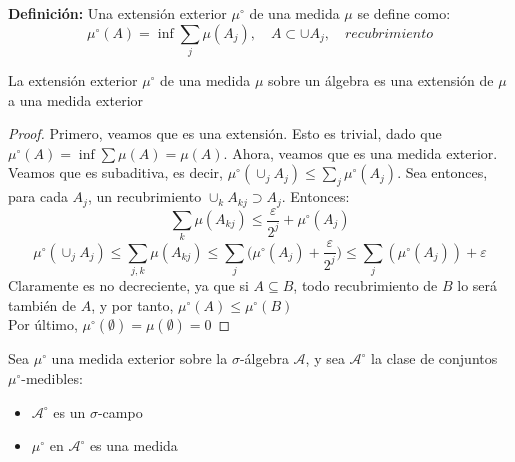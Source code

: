 \textbf{Definición:} Una extensión exterior $\mu^\circ$ de una medida $\mu$ se define como:
$$\mu^\circ (A) = \inf \sum_j \mu(A_j), \quad A \subset \cup A_j,\quad recubrimiento $$

\begin{theorem}
La extensión exterior $\mu^\circ$ de una medida $\mu$ sobre un álgebra es una extensión de $\mu$ a una medida exterior
\end{theorem}

\begin{proof}
Primero, veamos que es una extensión. Esto es trivial, dado que $\mu^\circ(A) = \inf \displaystyle \sum \mu(A) = \mu(A)$. Ahora, veamos que es una medida exterior.\\

Veamos que es subaditiva, es decir, $\mu^\circ(\displaystyle \cup_j A_j) \leq \sum_j \mu^\circ(A_j)$. Sea entonces, para cada $A_j$, un recubrimiento $ \displaystyle \cup_k A_{kj} \supset A_j$. Entonces:
$$ \sum_k \mu (A_{kj}) \leq \frac{\varepsilon}{2^j} + \mu^\circ (A_j)$$
$$ \mu^\circ (\cup_j A_j) \leq \sum_{j,k} \mu (A_{kj}) \leq \sum_j \Big( \mu^\circ(A_j) + \frac{\varepsilon}{2^j}\Big) \leq \sum_j (\mu^\circ(A_j)) + \varepsilon $$
Claramente es no decreciente, ya que si $A \subseteq B$, todo recubrimiento de $B$ lo será también de $A$, y por tanto, $\mu^\circ(A) \leq \mu^\circ(B)$\\

Por último, $\mu^\circ(\emptyset) = \mu(\emptyset) = 0$


\end{proof}

\begin{theorem}
Sea $\mu^\circ$ una medida exterior sobre la $\sigma$-álgebra $\mathcal{A}$, y sea $\mathcal{A}^\circ$ la clase de conjuntos $\mu^\circ$-medibles:
\begin{itemize}
\item $\mathcal{A}^\circ$ es un $\sigma$-campo
\item $\mu^\circ$ en $\mathcal{A}^\circ$ es una medida
\end{itemize}
\end{theorem}

